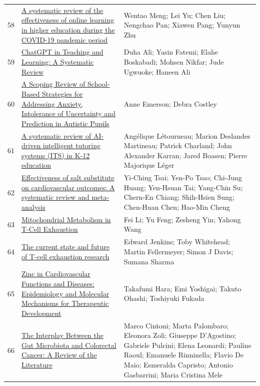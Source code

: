 \documentclass[11pt]{article}
\begin{document}
\begin{longtable}{cp{8cm}p{5cm}}
  58 & \href{https://www.frontiersin.org/journals/education/articles/10.3389/feduc.2023.1334153/full}{A systematic review of the effectiveness of online learning in higher education during the COVID-19 pandemic period} & Wentao Meng; Lei Yu; Chen Liu; Nengchao Pan; Xiawen Pang; Yunyun Zhu \\
  59 & \href{https://www.mdpi.com/2227-7102/14/6/643}{ChatGPT in Teaching and Learning: A Systematic Review} & Duha Ali; Yasin Fatemi; Elahe Boskabadi; Mohsen Nikfar; Jude Ugwuoke; Haneen Ali \\
  60 & \href{https://www.mdpi.com/2227-7102/13/6/575}{A Scoping Review of School-Based Strategies for Addressing Anxiety, Intolerance of Uncertainty and Prediction in Autistic Pupils} & Anne Emerson; Debra Costley \\
  61 & \href{https://www.nature.com/articles/s41539-025-00320-7}{A systematic review of AI-driven intelligent tutoring systems (ITS) in K-12 education} & Angélique Létourneau; Marion Deslandes Martineau; Patrick Charland; John Alexander Karran; Jared Boasen; Pierre Majorique Léger \\
  62 & \href{https://pubmed.ncbi.nlm.nih.gov/36196475/}{Effectiveness of salt substitute on cardiovascular outcomes: A systematic review and meta-analysis} & Yi-Ching Tsai; Yen-Po Tsao; Chi-Jung Huang; Yen-Hsuan Tai; Yang-Chin Su; Chern-En Chiang; Shih-Hsien Sung; Chen-Huan Chen; Hao-Min Cheng \\
  63 & \href{https://www.mdpi.com/1422-0067/26/15/7400}{Mitochondrial Metabolism in T-Cell Exhaustion} & Fei Li; Yu Feng; Zesheng Yin; Yahong Wang \\
  64 & \href{https://pubmed.ncbi.nlm.nih.gov/37554723/}{The current state and future of T-cell exhaustion research} & Edward Jenkins; Toby Whitehead; Martin Fellermeyer; Simon J Davis; Sumana Sharma \\
  65 & \href{https://pubmed.ncbi.nlm.nih.gov/37108314/}{Zinc in Cardiovascular Functions and Diseases: Epidemiology and Molecular Mechanisms for Therapeutic Development} & Takafumi Hara; Emi Yoshigai; Takuto Ohashi; Toshiyuki Fukada \\
  66 & \href{https://www.mdpi.com/2076-2607/13/6/1410}{The Interplay Between the Gut Microbiota and Colorectal Cancer: A Review of the Literature} & Marco Cintoni; Marta Palombaro; Eleonora Zoli; Giuseppe D'Agostino; Gabriele Pulcini; Elena Leonardi; Pauline Raoul; Emanuele Rinninella; Flavio De Maio; Esmeralda Capristo; Antonio Gasbarrini; Maria Cristina Mele \\

\end{longtable}
\end{document}
